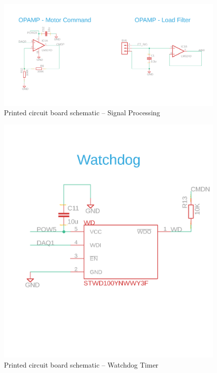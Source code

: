 \documentclass[12pt]{report}
\begin{document}
	\begin{figure}[h] 
		\centering
		\includegraphics[width=\linewidth]{pcb_schematic02}
		\caption{Printed circuit board schematic -- Signal Processing}
		\label{fig:pcb}
	\end{figure}
	
	
	\begin{figure}[h] 
		\centering
		\includegraphics[width=0.6\linewidth]{pcb_schematic03}
		\caption{Printed circuit board schematic -- Watchdog Timer}
		\label{fig:pcb}
	\end{figure}
	
\end{document}
